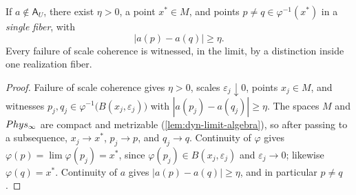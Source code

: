 \begin{lemma}
	\label{lem:dyn-ghost-localization}
	If \(a\notin\mathsf A_U\), there exist \(\eta>0\), a point
	\(x^*\in M\), and points
	\(p\neq q\in\varphi^{-1}(x^*)\) in a \emph{single fiber}, with
	\[
		|a(p)-a(q)|\ge\eta .
	\]
	Every failure of scale coherence is witnessed, in the limit, by a
	distinction inside one realization fiber.
\end{lemma}
\begin{proof}
	Failure of scale coherence gives \(\eta>0\), scales
	\(\varepsilon_j\downarrow0\), points \(x_j\in M\), and witnesses
	\(p_j,q_j\in\varphi^{-1}\bigl(B(x_j,\varepsilon_j)\bigr)\) with
	\(|a(p_j)-a(q_j)|\ge\eta\). The spaces \(M\) and
	\(Phys_\infty\) are compact and metrizable
	(\cref{lem:dyn-limit-algebra}), so after passing to a subsequence,
	\(x_j\to x^*\), \(p_j\to p\), and \(q_j\to q\). Continuity of
	\(\varphi\) gives
	\(\varphi(p)=\lim\varphi(p_j)=x^*\), since
	\(\varphi(p_j)\in B(x_j,\varepsilon_j)\) and
	\(\varepsilon_j\to0\); likewise \(\varphi(q)=x^*\). Continuity of
	\(a\) gives \(|a(p)-a(q)|\ge\eta\), and in particular
	\(p\neq q\).
\end{proof}

